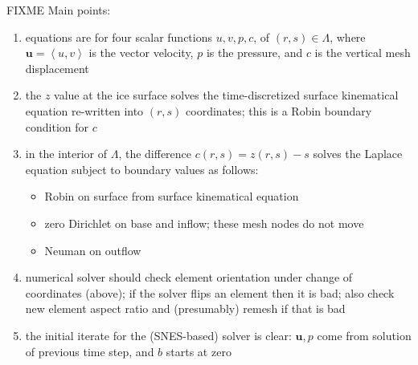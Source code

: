 \documentclass[letterpaper,final,12pt,reqno]{amsart}
\newcommand{\bu}{\mathbf{u}}
\begin{document}
FIXME Main points:
\renewcommand{\labelenumi}{\arabic{enumi}.}
\begin{enumerate}
\item equations are for four scalar functions $u,v,p,c$, of $(r,s) \in \Lambda$, where $\bu=\left<u,v\right>$ is the vector velocity, $p$ is the pressure, and $c$ is the vertical mesh displacement
\item the $z$ value at the ice surface solves the time-discretized surface kinematical equation re-written into $(r,s)$ coordinates; this is a Robin boundary condition for $c$
\item in the interior of $\Lambda$, the difference $c(r,s)=z(r,s)-s$ solves the Laplace equation subject to boundary values as follows:
    \begin{itemize}
    \item Robin on surface from surface kinematical equation
    \item zero Dirichlet on base and inflow; these mesh nodes do not move
    \item Neuman on outflow
    \end{itemize}
\item numerical solver should check element orientation under change of coordinates (above); if the solver flips an element then it is bad; also check new element aspect ratio and (presumably) remesh if that is bad
\item the initial iterate for the (SNES-based) solver is clear: $\bu,p$ come from solution of previous time step, and $b$ starts at zero
\end{enumerate}



\small

\bigskip


\end{document}
